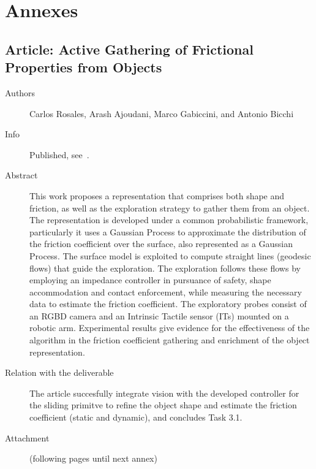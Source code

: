 \documentclass[a4paper,11pt,pdf]{pacmanreport}
\begin{document}
% 
\newpage



\newpage
\appendix
\section{Annexes}
\label{sec:annex}


\subsection{Article: Active Gathering of Frictional Properties from Objects} \label{sec:slidingPointClouds}
\begin{description}
	\item[Authors] Carlos Rosales, Arash Ajoudani, Marco Gabiccini, and Antonio Bicchi
	\item[Info] Published, see~\cite{Rosales2014Active}.
	\item[Abstract] This work proposes a representation that comprises both shape and friction, as well as the exploration strategy to gather them from an object. The representation is developed under a common probabilistic framework, particularly it uses a Gaussian Process to approximate the distribution of the friction coefficient over the surface, also represented as a Gaussian Process. The surface model is exploited to compute straight lines (geodesic flows) that guide the exploration. The exploration follows these flows by employing an impedance
controller in pursuance of safety, shape accommodation and contact enforcement, while measuring the necessary data to estimate the friction coefficient. The exploratory probes consist of an RGBD camera and an Intrinsic Tactile sensor (ITs) mounted on a robotic arm. Experimental results give evidence for the effectiveness of the algorithm in the friction coefficient gathering and enrichment of the object representation.
	\item[Relation with the deliverable] The article succesfully integrate vision with the developed controller for the sliding primitve to refine the object shape and estimate the friction coefficient (static and dynamic), and concludes Task 3.1.
	\item[Attachment] (following pages until next annex)
\end{description}

\end{document}

